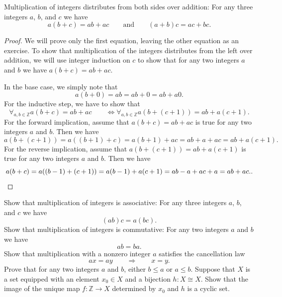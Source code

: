 \begin{theorem}
  Multiplication of integers distributes from both sides over addition: For any three integers $a$, $b$, and $c$ we have
  \begin{equation*}
    a(b+c)=ab+ac\qquad\text{and}\qquad (a+b)c=ac+bc.
  \end{equation*}
\end{theorem}

\begin{proof}
  We will prove only the first equation, leaving the other equation as an exercise. To show that multiplication of the integers distributes from the left over addition, we will use integer induction on $c$ to show that for any two integers $a$ and $b$ we have $a(b+c)=ab+ac$.

  In the base case, we simply note that
  \begin{equation*}
    a(b+0)=ab=ab+0=ab+a0.
  \end{equation*}
  For the inductive step, we have to show that
  \begin{equation*}
    \forall_{a,b\in\mathbb{Z}}a(b+c)=ab+ac\qquad\Leftrightarrow \forall_{a,b\in\mathbb{Z}} a(b+(c+1))=ab+a(c+1).
  \end{equation*}
  For the forward implication, assume that $a(b+c)=ab+ac$ is true for any two integers $a$ and $b$. Then we have
  \begin{equation*}
    a(b+(c+1))=a((b+1)+c)=a(b+1)+ac=ab+a+ac=ab+a(c+1).
  \end{equation*}
  For the reverse implication, assume that $a(b+(c+1))=ab+a(c+1)$ is true for any two integers $a$ and $b$. Then we have
  \begin{equation*}
    a(b+c)=a((b-1)+(c+1))=a(b-1)+a(c+1)=ab-a+ac+a=ab+ac.\qedhere.
  \end{equation*}
\end{proof}

\exercises

\begin{routine}
  \exercise Show that multiplication of integers is associative: For any three integers $a$, $b$, and $c$ we have
  \begin{equation*}
    (ab)c=a(bc).
  \end{equation*}
  \exercise Show that multiplication of integers is commutative: For any two integers $a$ and $b$ we have
  \begin{equation*}
    ab=ba.
  \end{equation*}
  \exercise Show that multiplication with a nonzero integer $a$ satisfies the cancellation law
  \begin{equation*}
    ax=ay\qquad\Rightarrow\qquad x=y.
  \end{equation*}
  \exercise Prove that for any two integers $a$ and $b$, either $b\leq a$ or $a\leq b$.
  \exercise Suppose that $X$ is a set equipped with an element $x_0\in X$ and a bijection $h:X\cong X$. Show that the image of the unique map $f:\mathbb{Z}\to X$ determined by $x_0$ and $h$ is a cyclic set.
\end{routine}



